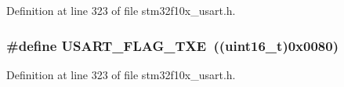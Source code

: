 Definition at line 323 of file stm32f10x\+\_\+usart.\+h.

\subsubsection[{\texorpdfstring{U\+S\+A\+R\+T\+\_\+\+F\+L\+A\+G\+\_\+\+T\+XE}{USART_FLAG_TXE}}]{\setlength{\rightskip}{0pt plus 5cm}\#define U\+S\+A\+R\+T\+\_\+\+F\+L\+A\+G\+\_\+\+T\+XE~(({\bf uint16\+\_\+t})0x0080)}\hypertarget{group___u_s_a_r_t___flags_ga7129f13333f2a7218838cc32fe507bfa}{}\label{group___u_s_a_r_t___flags_ga7129f13333f2a7218838cc32fe507bfa}


Definition at line 323 of file stm32f10x\+\_\+usart.\+h.

